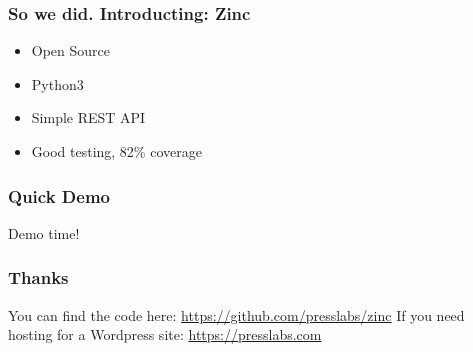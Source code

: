 \documentclass{beamer}
\begin{document}
\begin{frame}
  \frametitle{So we did. Introducting: Zinc}
  \begin{itemize}
  \item Open Source
  \item Python3
  \item Simple REST API
  \item Good testing, 82\% coverage
  \end{itemize}
\end{frame}

\begin{frame}
  \frametitle{Quick Demo}
  Demo time!
\end{frame}

\begin{frame}
  \frametitle{Thanks}
  You can find the code here:
  \newline
  \href{https://github.com/presslabs/zinc}{https://github.com/presslabs/zinc}
  \newline
  \newline
  If you need hosting for a Wordpress site:
  \newline
  \href{https://presslabs.com}{https://presslabs.com}
\end{frame}
\end{document}
